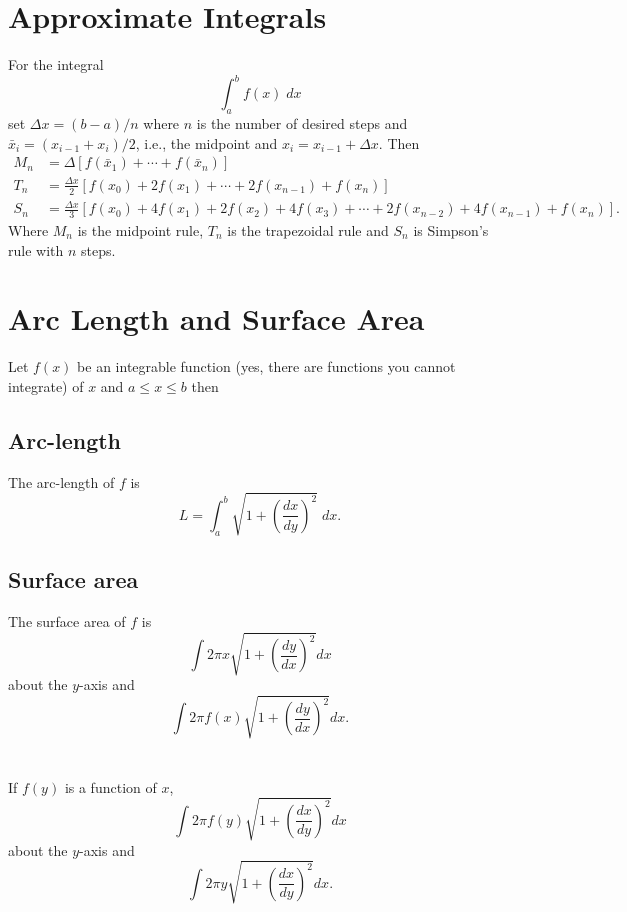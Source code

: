 \section{Approximate Integrals}
For the integral
\[
\int_a^b f(x)\;dx
\]
set $\Delta x=(b-a)/n$ where $n$ is the number of desired steps and $\bar
x_i=(x_{i-1}+x_i)/2$, i.e., the midpoint and $x_i=x_{i-1}+\Delta x$. Then
\begin{align}
  \label{eq:approx-integrals}
M_n&=\Delta\left[f(\bar x_1)+\cdots+f(\bar x_n)\right]\\
T_n&=\frac{\Delta x}{2}\left[f(x_0)+2f(x_1)+\cdots+2
  f(x_{n-1})+f(x_n)\right]\\
S_n&=\frac{\Delta x}{3}\left[f(x_0)+4f(x_1)+2f(x_2)+4f(x_3)+\cdots
  +2f(x_{n-2})+4f(x_{n-1})+f(x_n)\right].
\end{align}
Where $M_n$ is the midpoint rule, $T_n$ is the trapezoidal rule and $S_n$
is Simpson's rule with $n$ steps.

\section{Arc Length and Surface Area}
Let $f(x)$ be an integrable function (yes, there are functions you cannot
integrate) of $x$ and $a\leq x\leq b$ then
\subsection{Arc-length}
The arc-length of $f$ is
\begin{equation}
\label{eq:arc-length}
L=\int_a^b\sqrt{1+\left(\frac{dx}{dy}\right)^2}\;dx.
\end{equation}
\subsection{Surface area}
The surface area of $f$ is
\begin{equation}
\label{eq:surface-area-y}
\int 2\pi x\sqrt{1+\left(\frac{dy}{dx}\right)^2}dx
\end{equation}
about the $y$-axis and
\begin{equation}
\label{eq:surface-area-x}
\int 2\pi f(x)\sqrt{1+\left(\frac{dy}{dx}\right)^2}dx.
\end{equation}
\\\\
If $f(y)$ is a function of $x$,
\begin{equation}
\label{eq:surface-area-y-2}
\int 2\pi f(y)\sqrt{1+\left(\frac{dx}{dy}\right)^2}dx
\end{equation}
about the $y$-axis and
\begin{equation}
\label{eq:surface-area-x-2}
\int 2\pi y\sqrt{1+\left(\frac{dx}{dy}\right)^2}dx.
\end{equation}
